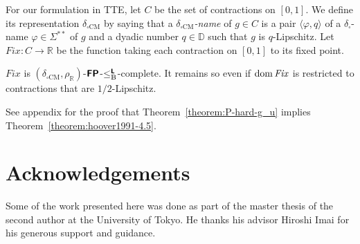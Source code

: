 \documentclass[envcountsect,envcountsame,orivec,oribibl]{llncs}
\newcommand{\R}{\mathbb R}
\newcommand{\D}{\mathbb D}
\newcommand{\classtwofont}[1]{\text{\bfseries \sffamily \upshape #1}}
\newcommand{\classLtwo}{\classtwofont{L}}
\newcommand{\classFPtwo}{\classtwofont{FP}}
\newcommand{\deltabox}{\delta _\square}
\newcommand{\deltaboxCM}{\delta _{\square \mathrm{CM}}}
\newcommand{\rhoR}{\rho _\R}
\newcommand{\redB}{\leq _{\mathrm B}}
\newcommand{\redLB}{\redB ^{\classLtwo}}
\newcommand{\LM}{\varSigma ^{**}}
\newcommand{\OpCMFix}{\mathit{Fix}}
\newcommand{\dom}{\mathop{\rm dom}}
\begin{document}
For our formulation in TTE, 
let $C$ be the set of contractions on $[0, 1]$. 
We define its representation $\deltaboxCM$ by saying that 
a \emph{$\deltaboxCM$-name} of $g \in C$
is a pair $\langle \varphi, q \rangle$ of 
a $\deltabox$-name $\varphi \in \LM$ of $g$ 
and a dyadic number $q \in \D$ such that $g$ is $q$-Lipschitz. 
Let $\OpCMFix \colon C \to \R$ be the function
taking each contraction on $[0, 1]$ to its fixed point.

\begin{theorem}
\label{theorem:P-hard-g_u}
$\OpCMFix$ is $(\deltaboxCM, \rhoR)$-$\classFPtwo$-$\redLB$-complete. 
It remains so even if $\dom \OpCMFix$ is restricted to contractions 
that are $1/2$-Lipschitz.
\end{theorem}

See appendix for the proof that Theorem~\ref{theorem:P-hard-g_u} 
implies Theorem~\ref{theorem:hoover1991-4.5}. 

\section*{Acknowledgements}
Some of the work presented here was done as part of the master thesis 
of the second author at the University of Tokyo.
He thanks his advisor Hiroshi Imai for 
his generous support and guidance.
\end{document}
